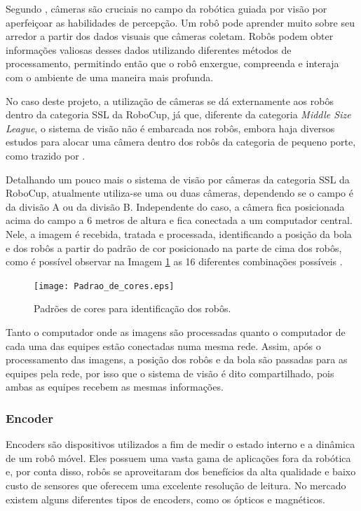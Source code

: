 \documentclass[acronym, symbols, table]{fei}
\begin{document}
				Segundo \textcite{cameras_technexion}, câmeras são cruciais no campo da robótica guiada por visão por aperfeiçoar as habilidades de percepção. Um robô pode aprender muito sobre seu arredor a partir dos dados visuais que câmeras coletam. Robôs podem obter informações valiosas desses dados utilizando diferentes métodos de processamento, permitindo então que o robô enxergue, compreenda e interaja com o ambiente de uma maneira mais profunda.
				
				No caso deste projeto, a utilização de câmeras se dá externamente aos robôs dentro da categoria SSL da RoboCup, já que, diferente da categoria \textit{Middle Size League}, o sistema de visão não é embarcada nos robôs, embora haja diversos estudos para alocar uma câmera dentro dos robôs da categoria de pequeno porte, como trazido por \textcite{melo2022embedded}.
				
				Detalhando um pouco mais o sistema de visão por câmeras da categoria SSL da RoboCup, atualmente utiliza-se uma ou duas câmeras, dependendo se o campo é da divisão A ou da divisão B. Independente do caso, a câmera fica posicionada acima do campo a 6 metros de altura e fica conectada a um computador central. Nele, a imagem é recebida, tratada e processada, identificando a posição da bola e dos robôs a partir do padrão de cor posicionado na parte de cima dos robôs, como é possível observar na Imagem \ref{fig:color_patterns} as 16 diferentes combinações possíveis \cite{10.1007/978-3-642-11876-0_37}.
				
				\begin{figure}[!htb]
					\centering
					\caption{Padrões de cores para identificação dos robôs.} 
					\texttt{[image: Padrao\_de\_cores.eps]}
					\label{fig:color_patterns}
				\end{figure}
			
				Tanto o computador onde as imagens são processadas quanto o computador de cada uma das equipes estão conectadas numa mesma rede. Assim, após o processamento das imagens, a posição dos robôs e da bola são passadas para as equipes pela rede, por isso que o sistema de visão é dito compartilhado, pois ambas as equipes recebem as mesmas informações.
			
			\subsubsection{Encoder}
				
				Encoders são dispositivos utilizados a fim de medir o estado interno e a dinâmica de um robô móvel. Eles possuem uma vasta gama de aplicações fora da robótica e, por conta disso, robôs se aproveitaram dos benefícios da alta qualidade e baixo custo de sensores que oferecem uma excelente resolução de leitura. No mercado existem alguns diferentes tipos de encoders, como os ópticos e magnéticos. 
				
\end{document}
